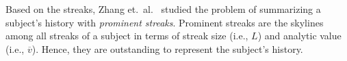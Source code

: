 Based on the streaks, Zhang et.~al.~\cite{zhang2014discovering} studied the problem
of summarizing a subject's history with \emph{prominent streaks}. Prominent streaks
are the skylines among all streaks of a subject in terms of streak size (i.e., $L$) and analytic value (i.e., $\overline{v}$). Hence, they are outstanding to represent the subject's history.
%
%
%
%
%
%
